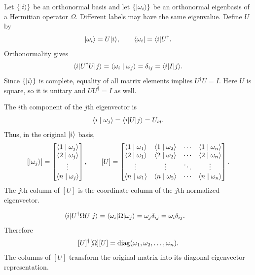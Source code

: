 Let $\{\lvert i\rangle\}$ be an orthonormal basis and let
$\{\lvert \omega_i\rangle\}$ be an orthonormal eigenbasis of a Hermitian
operator $\Omega$. Different labels may have the same eigenvalue.
Define $U$ by
\[
 \lvert \omega_i\rangle=U\lvert i\rangle,\qquad
 \langle \omega_i\rvert=\langle i\rvert U^\dagger.
\]
Orthonormality gives
\[
 \langle i\rvert U^\dagger U\lvert j\rangle
 =\langle \omega_i\mid \omega_j\rangle
 =\delta_{ij}=\langle i\rvert I\lvert j\rangle.
\]
Since $\{\lvert i\rangle\}$ is complete, equality of all matrix elements
implies $U^\dagger U=I$. Here $U$ is square, so it is unitary and
$UU^\dagger=I$ as well.

The $i$th component of the $j$th eigenvector is
\[
 \langle i\mid \omega_j\rangle=\langle i\rvert U\lvert j\rangle=U_{ij}.
\]
Thus, in the original $\lvert i\rangle$ basis,
\[
 [\lvert \omega_j\rangle]=
 \begin{bmatrix}\langle 1\mid \omega_j\rangle\\\langle 2\mid \omega_j\rangle\\\vdots\\\langle n\mid \omega_j\rangle\end{bmatrix},
 \qquad
 [U]=\begin{bmatrix}
 \langle 1\mid \omega_1\rangle&\langle 1\mid \omega_2\rangle&\cdots&\langle 1\mid \omega_n\rangle\\
 \langle 2\mid \omega_1\rangle&\langle 2\mid \omega_2\rangle&\cdots&\langle 2\mid \omega_n\rangle\\
 \vdots&\vdots&\ddots&\vdots\\
 \langle n\mid \omega_1\rangle&\langle n\mid \omega_2\rangle&\cdots&\langle n\mid \omega_n\rangle
 \end{bmatrix}.
\]
The $j$th column of $[U]$ is the coordinate column of the $j$th
normalized eigenvector.

\begin{align*}
 \langle i\rvert U^\dagger\Omega U\lvert j\rangle
 &=\langle \omega_i\rvert \Omega\lvert \omega_j\rangle
 =\omega_j\delta_{ij}
 =\omega_i\delta_{ij}.
\end{align*}
Therefore
\[
 [U]^\dagger[\Omega][U]=\operatorname{diag}(\omega_1,\omega_2,\ldots,\omega_n).
\]
The columns of $[U]$ transform the original matrix into its diagonal
eigenvector representation.
